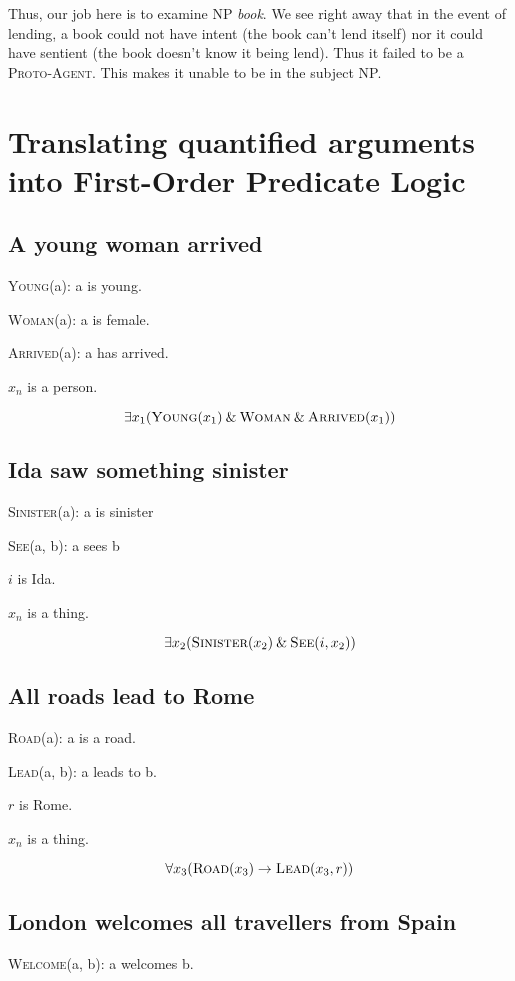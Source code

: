 \documentclass{article}
\begin{document}
Thus, our job here is to examine NP \textit{book}. We see right away that in the event of lending, a book could not have intent (the book can't lend itself) nor it could have sentient (the book doesn't know it being lend). Thus it failed to be a \textsc{Proto-Agent}. This makes it unable to be in the subject NP.

\section{Translating quantified arguments into First-Order Predicate Logic}

\subsection{A young woman arrived}
\textsc{Young}(a): a is young.

\textsc{Woman}(a): a is female.

\textsc{Arrived}(a): a has arrived.

$x_n$ is a person.

$$ \exists x_1 (\textsc{Young}(x_1) \mathbin{\&} \textsc{Woman} \mathbin{\&} \textsc{Arrived}(x_1)) $$

\subsection{Ida saw something sinister}
\textsc{Sinister}(a): a is sinister

\textsc{See}(a, b): a sees b

$i$ is Ida.

$x_n$ is a thing. 

$$\exists x_2 (\textsc{Sinister}(x_2) \mathbin{\&} \textsc{See}(i, x_2))$$

\subsection{All roads lead to Rome}
\textsc{Road}(a): a is a road.

\textsc{Lead}(a, b): a leads to b.

$r$ is Rome.

$x_n$ is a thing. 

$$ \forall x_3 (\textsc{Road}(x_3) \rightarrow \textsc{Lead}(x_3, r))$$



\subsection{London welcomes all travellers from Spain}
\textsc{Welcome}(a, b): a welcomes b.
\end{document}
